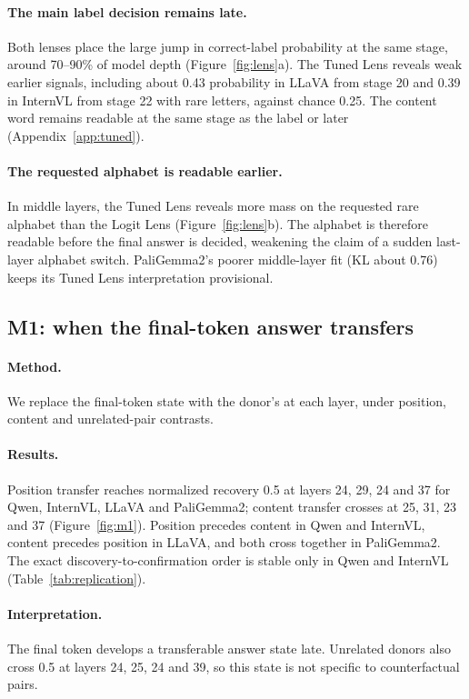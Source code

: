 \documentclass[11pt]{article}
\begin{document}
\paragraph{The main label decision remains late.} Both lenses place the large jump in correct-label probability at the same stage, around 70--90\% of model depth (Figure~\ref{fig:lens}a). The Tuned Lens reveals weak earlier signals, including about 0.43 probability in LLaVA from stage 20 and 0.39 in InternVL from stage 22 with rare letters, against chance 0.25. The content word remains readable at the same stage as the label or later (Appendix~\ref{app:tuned}).

\paragraph{The requested alphabet is readable earlier.} In middle layers, the Tuned Lens reveals more mass on the requested rare alphabet than the Logit Lens (Figure~\ref{fig:lens}b). The alphabet is therefore readable before the final answer is decided, weakening the claim of a sudden last-layer alphabet switch. PaliGemma2's poorer middle-layer fit (KL about 0.76) keeps its Tuned Lens interpretation provisional.

\subsection{M1: when the final-token answer transfers}

\paragraph{Method.} We replace the final-token state with the donor's at each layer, under position, content and unrelated-pair contrasts.

\paragraph{Results.} Position transfer reaches normalized recovery 0.5 at layers 24, 29, 24 and 37 for Qwen, InternVL, LLaVA and PaliGemma2; content transfer crosses at 25, 31, 23 and 37 (Figure~\ref{fig:m1}). Position precedes content in Qwen and InternVL, content precedes position in LLaVA, and both cross together in PaliGemma2. The exact discovery-to-confirmation order is stable only in Qwen and InternVL (Table~\ref{tab:replication}).

\paragraph{Interpretation.} The final token develops a transferable answer state late. Unrelated donors also cross 0.5 at layers 24, 25, 24 and 39, so this state is not specific to counterfactual pairs.
\end{document}
